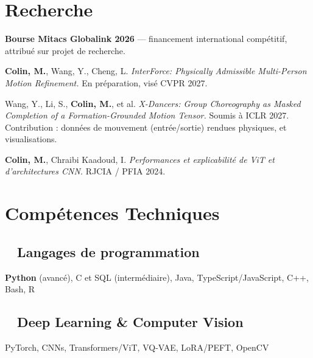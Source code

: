 \documentclass{assets/template/cvclass}
\def\spaceSections{0.13cm}
\begin{document}
\header
\content


\begin{area-left}
  \section{Recherche}
  \vspace{\spaceSections}
    \textbf{Bourse Mitacs Globalink 2026} --- financement international compétitif, attribué sur projet de recherche.

    \vspace{0.2cm}
    \textbf{Colin, M.}, Wang, Y., Cheng, L. \textit{InterForce: Physically Admissible Multi-Person Motion Refinement.} En préparation, visé CVPR 2027.

    \vspace{0.2cm}
    Wang, Y., Li, S., \textbf{Colin, M.}, et al. \textit{X-Dancers: Group Choreography as Masked Completion of a Formation-Grounded Motion Tensor.} Soumis à ICLR 2027. Contribution : données de mouvement (entrée/sortie) rendues physiques, et visualisations.

    \vspace{0.2cm}
    \textbf{Colin, M.}, Chraibi Kaadoud, I. \textit{Performances et explicabilité de ViT et d'architectures CNN.} RJCIA / PFIA 2024. \href{https://hal.science/hal-04641791v1}{\faPaperclip}
    
  \vspace{\spaceSections}
  \section{Compétences Techniques}
  \vspace{\spaceSections}
    \subsection{\faCode~ Langages de programmation}
      \textbf{Python} (avancé), C et SQL (intermédiaire), Java, TypeScript/JavaScript, C++, Bash, R

    \vspace{\spaceSections}
    \subsection{\faBrain~ Deep Learning \& Computer Vision}
      PyTorch, CNNs, Transformers/ViT, VQ-VAE, LoRA/PEFT, OpenCV


\end{area-left}
\end{document}
